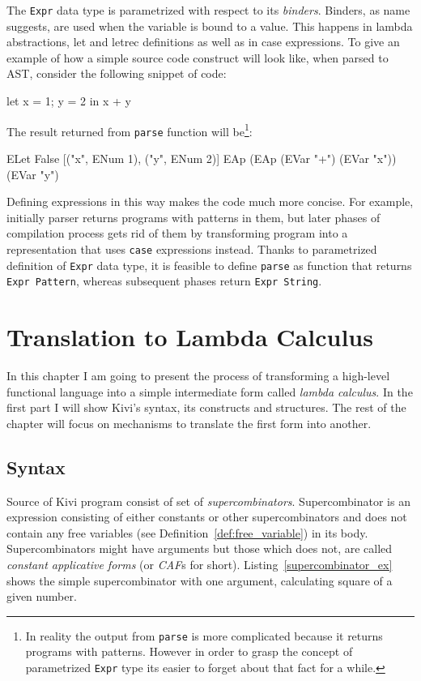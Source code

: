 \documentclass[12pt,a4paper]{report}
\begin{document}
The \texttt{Expr} data type is parametrized with respect to its
\textit{binders}. Binders, as name suggests, are used when the variable is
bound to a value. This happens in lambda abstractions, let and letrec
definitions as well as in case expressions. To give an example of how a simple
source code construct will look like, when parsed to AST, consider the
following snippet of code:

\vspace*{0.2in}
\begin{code}[style=haskell]
let
    x = 1;
    y = 2
in
    x + y
\end{code}

The result returned from \texttt{parse} function will be\footnote{In reality
the output from \texttt{parse} is more complicated because it returns programs
with patterns. However in order to grasp the concept of parametrized
\texttt{Expr} type its easier to forget about that fact for a while.}:

\vspace*{0.2in}
\begin{code}[style=haskell]
  ELet False
       [("x", ENum 1), ("y", ENum 2)]
       EAp (EAp (EVar "+") (EVar "x")) (EVar "y")
\end{code}

Defining expressions in this way makes the code much more concise. For example,
initially parser returns programs with patterns in them, but later phases of
compilation process gets rid of them by transforming program into a
representation that uses \texttt{case} expressions instead. Thanks to
parametrized definition of \texttt{Expr} data type, it is feasible to define
\texttt{parse} as function that returns \texttt{Expr Pattern}, whereas
subsequent phases return \texttt{Expr String}.


\chapter{Translation to Lambda Calculus}

In this chapter I am going to present the process of transforming a high-level
functional language into a simple intermediate form called \textit{lambda
calculus}. In the first part I will show Kivi's syntax, its constructs and
structures. The rest of the chapter will focus on mechanisms to translate the
first form into another.

\section{Syntax}
Source of Kivi program consist of set of
\textit{supercombinators}\cite{wiki:supercombinator}. Supercombinator is an
expression consisting of either constants or other supercombinators and does
not contain any free variables (see Definition~\ref{def:free_variable}) in its
body. Supercombinators might have arguments but those which does not, are
called \textit{constant applicative forms} (or \textit{CAF}s for short).
Listing~\ref{supercombinator_ex} shows the simple supercombinator with one
argument, calculating square of a given number.
\end{document}
